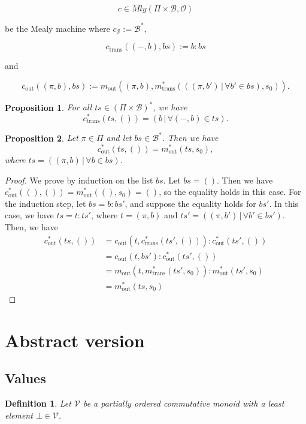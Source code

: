 \documentclass[runningheads]{llncs}
\newtheorem{defn}{Definition}
\newtheorem{prop}{Proposition}
\newcommand{\V}{\mathcal{V}}
\renewcommand{\S}{\mathcal{S}}
\newcommand{\B}{\mathcal{B}}
\renewcommand{\O}{\mathcal{O}}
\newcommand{\mly}[2]{Mly(#1, #2)}
\newcommand{\trans}[1]{#1_{\text{trans}}}
\newcommand{\out}[1]{#1_{\text{out}}}
\newcommand{\ms}[1]{#1_{\S}}
\begin{document}
\[c \in \mly{\Pi \times \B}{\O}\]

be the Mealy machine where \(\ms{c} := \B^*\),

\[ \trans{c}\left((-,b),bs\right) := b : bs \]

and

\[
  \out{c}\left((\pi,b),bs\right) := \out{m}\left((\pi,b),
  \trans{m^*}(((\pi,b') \, | \, \forall b' \in bs), s_0)\right).
\]

\begin{prop}
  For all \(ts \in (\Pi \times \B)^*\), we have
  \[\trans{c}^*(ts, ()) = (b \, | \, \forall (-,b) \in ts).\]
\end{prop}

\begin{prop}\label{thm:same-balance-proofs}
  Let \(\pi \in \Pi\) and let \(bs \in \B^*\). Then we
  have \[\out{c^*}\left(ts, ()\right) =
  \out{m^*}(ts, s_0),\] where \(ts = ((\pi,b) \, | \, \forall b \in bs)\).
\end{prop}

\begin{proof}
  We prove by induction on the list \(bs\). Let \(bs = ()\). Then we have
  \(\out{c}^*\left((), ()\right) = \out{m}^*\left((), s_0\right) = ()\),
  so the equality holds in this case. For the induction step, let
  \(bs = b : bs'\), and suppose the equality holds for \(bs'\). In
  this case, we have \(ts = t : ts'\), where \(t = (\pi, b)\) and
  \(ts' = ((\pi,b') \, | \, \forall b' \in bs')\). Then, we have
  \begin{align*}
    \out{c^*}\left(ts, ()\right) &= \out{c}(t, \trans{c^*}(ts', ()))
    : \out{c^*}(ts', ()) \\
    &= \out{c}(t, bs') : \out{c^*}(ts', ()) \\
    &= \out{m}(t, \trans{m^*}(ts', s_0)) : \out{m^*}(ts', s_0) \\
    &= \out{m^*}(ts, s_0)
  \end{align*}
\end{proof}

\newpage

\section{Abstract version}

\subsection{Values}

\begin{defn}
  Let \(\V\) be a partially ordered commutative monoid with a least
  element \(\bot \in \V\).
\end{defn}
\end{document}
